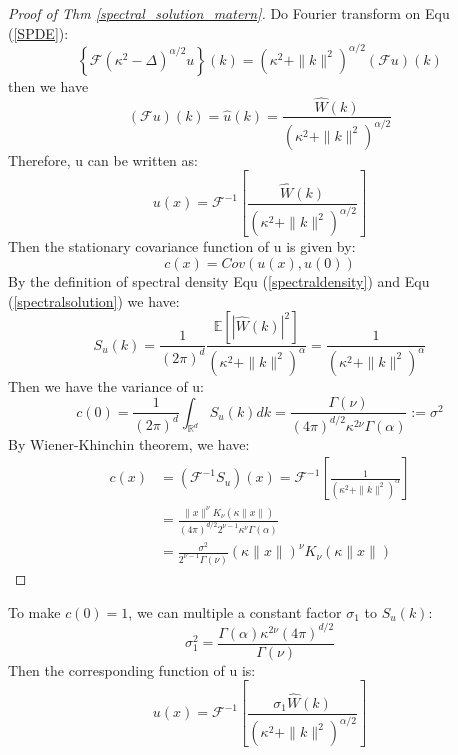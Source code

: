 \begin{proof}[Proof of Thm \ref{spectral_solution_matern}]
	Do Fourier transform on Equ (\ref{SPDE}):
\begin{equation}
	\left\{\mathcal{F}(\kappa^2 - \Delta)^{\alpha/2} u\right\}(k) = (\kappa^2 + \|k\|^2)^{\alpha/2}(\mathcal{F}u)(k)
\end{equation}
then we have 
\begin{equation}\label{spectralsolution}
	(\mathcal{F}u)(k) = \hat{u}(k) = \frac{\hat{W}(k)}{(\kappa^2 + \|k\|^2)^{\alpha/2}} 
\end{equation}
Therefore, u can be written as:
\begin{equation}
	u(x) = \mathcal{F}^{-1}\left[\frac{\hat{W}(k)}{(\kappa^2 + \|k\|^2)^{\alpha/2}}\right]
\end{equation}
Then the stationary covariance function of u is given by:
\begin{equation}
	c(x) = Cov(u(x), u(0))
\end{equation}
By the definition of spectral density Equ (\ref{spectraldensity}) and Equ (\ref{spectralsolution}) we have:
\begin{equation}\label{Suk}
		S_u(k) = \frac{1}{(2\pi)^{d}}\frac{\mathbb{E}\left[\left|\hat{W}(k)\right|^2\right]}{(\kappa^2 + \|k\|^2)^{\alpha}} 
		= \frac{1}{(\kappa^2 + \|k\|^2)^{\alpha}} 
\end{equation}
Then we have the variance of u:
\begin{equation}
	c(0) = \frac{1}{(2\pi)^{d}}\int_{\mathbb{R}^d} S_u(k) dk = \frac{\Gamma(\nu)}{(4\pi)^{d/2}\kappa^{2\nu}\Gamma(\alpha) }:=\sigma^2
\end{equation}
	By Wiener-Khinchin theorem, we have:
\begin{equation}
	\begin{aligned}
		c(x) &= (\mathcal{F}^{-1}S_u)(x)=\mathcal{F}^{-1}\left[\frac{1}{(\kappa^2 + \|k\|^2)^{\alpha}}\right]\\
		&= \frac{\|x\|^\nu K_{\nu}(\kappa\|x\|)}{(4\pi)^{d/2}2^{\nu-1}\kappa^{\nu}\Gamma(\alpha)}\\
		& = \frac{\sigma^2}{2^{\nu -1}\Gamma(\nu)}(\kappa \|x\|)^\nu K_\nu (\kappa \|x\|)
	\end{aligned}
\end{equation}
\end{proof}
\begin{remark}
	To make $c(0) = 1$, we can multiple a constant factor $\sigma_1$ to $S_u(k)$:
	\begin{equation}
		\sigma_1^2 = \frac{\Gamma(\alpha) \kappa^{2\nu}(4\pi)^{d/2}}{\Gamma(\nu)}
	\end{equation}
	Then the corresponding function of u is:
	\begin{equation}
		u(x) = \mathcal{F}^{-1}\left[\frac{\sigma_1\hat{W}(k)}{(\kappa^2 + \|k\|^2)^{\alpha/2}}\right]
	\end{equation}
\end{remark}
